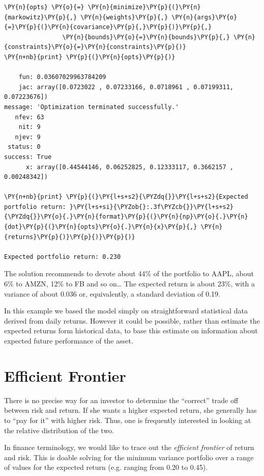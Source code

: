 \begin{tcolorbox}[breakable, size=fbox, boxrule=1pt, pad at break*=1mm,colback=cellbackground, colframe=cellborder]
\begin{Verbatim}[commandchars=\\\{\}]
\PY{n}{opts} \PY{o}{=} \PY{n}{minimize}\PY{p}{(}\PY{n}{markowitz}\PY{p}{,} \PY{n}{weights}\PY{p}{,} \PY{n}{args}\PY{o}{=}\PY{p}{(}\PY{n}{covariance}\PY{p}{,}\PY{p}{)}\PY{p}{,}
                \PY{n}{bounds}\PY{o}{=}\PY{n}{bounds}\PY{p}{,} \PY{n}{constraints}\PY{o}{=}\PY{n}{constraints}\PY{p}{)}
\PY{n+nb}{print} \PY{p}{(}\PY{n}{opts}\PY{p}{)}

    fun: 0.03607029963784209
    jac: array([0.0723022 , 0.07233166, 0.0718961 , 0.07199311, 0.07223676])
message: 'Optimization terminated successfully.'
   nfev: 63
    nit: 9
   njev: 9
 status: 0
success: True
      x: array([0.44544146, 0.06252825, 0.12333117, 0.3662157 , 0.00248342])

\PY{n+nb}{print} \PY{p}{(}\PY{l+s+s2}{\PYZdq{}}\PY{l+s+s2}{Expected portfolio return: }\PY{l+s+si}{\PYZob{}:.3f\PYZcb{}}\PY{l+s+s2}{\PYZdq{}}\PY{o}{.}\PY{n}{format}\PY{p}{(}\PY{n}{np}\PY{o}{.}\PY{n}{dot}\PY{p}{(}\PY{n}{opts}\PY{o}{.}\PY{n}{x}\PY{p}{,} \PY{n}{returns}\PY{p}{)}\PY{p}{)}\PY{p}{)}

Expected portfolio return: 0.230
\end{Verbatim}
\end{tcolorbox}

The solution recommends to devote about 44\% of the portfolio to AAPL,
about 6\% to AMZN, 12\% to FB and so on\ldots 
The expected return is
about 23\%, with a variance of about 0.036 or, equivalently, a standard deviation of 0.19.

In this example we based the model simply on straightforward statistical
data derived from daily returns. However it could be possible, rather
than estimate the expected returns form historical data,
to base this estimate on information about
expected future performance of the asset.

\section{Efficient Frontier}\label{efficient-frontier}
There is no precise way for an investor to determine the “correct” trade off between risk and return. If she wants a higher expected return, she generally has to “pay for it” with higher risk. Thus, one is frequently interested in looking at the relative distribution of the two.

In finance terminology, we would like to trace out the \emph{efficient frontier} of return and risk. This is doable solving for the minimum variance portfolio over a range of values for the expected return (e.g. ranging from 0.20 to 0.45).

